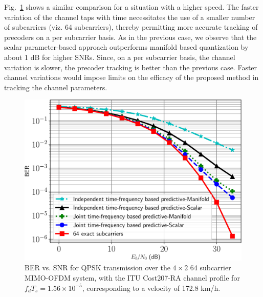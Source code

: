 \documentclass[journal,10pt,twocolumn]{IEEEtran}
\def\imwidth{0.65}
\begin{document}
Fig.~\ref{fig:ber_veh} shows a similar comparison for a situation with
a higher speed. The faster variation of the channel taps with time
necessitates the use of a smaller number of subcarriers (viz. 64
subcarriers), thereby permitting more accurate tracking of precoders
on a per subcarrier basis. As in the previous case, we observe that
the scalar parameter-based approach outperforms manifold based
quantization by about 1 dB for higher SNRs. Since, on a per subcarrier
basis, the channel variation is slower, the precoder tracking is
better than the previous case. Faster channel variations would impose
limits on the efficacy of the proposed method in tracking the channel
parameters.
\begin{figure}
\begin{center}
\includegraphics[width=\imwidth\columnwidth]{images/64final_withtime}
\caption{BER vs. SNR for QPSK transmission over the $4\times 2$ 64
  subcarrier MIMO-OFDM system, with the ITU Cost207-RA channel profile
  for $f_dT_s = 1.56\times 10^{-5}$, corresponding to a velocity of 172.8 km/h.}
\label{fig:ber_veh}
\end{center}
\end{figure}


\end{document}
